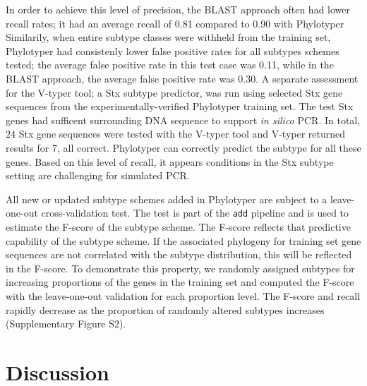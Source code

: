 \documentclass{bioinfo}
\begin{document}
In order to achieve this level of precision, the BLAST approach often had lower recall rates; it had an average recall of 0.81 compared to 0.90 with Phylotyper
Similarily, when entire subtype classes were withheld from the training set, Phylotyper had consistenly lower false positive rates for all subtypes schemes tested; the average false positive rate in this test case was 0.11, while in the BLAST approach, the average false positive rate was 0.30.
A separate assessment for the V-typer tool; a Stx subtype predictor, was run using selected Stx gene sequences from the experimentally-verified Phylotyper training set.
The test Stx genes had sufficent surrounding DNA sequence to support \textit{in silico} PCR.
In total, 24 Stx gene sequences were tested with the V-typer tool and V-typer returned results for 7, all correct.
Phylotyper can correctly predict the subtype for all these genes.
Based on this level of recall, it appears conditions in the Stx subtype setting are challenging for simulated PCR.

All new or updated subtype schemes added in Phylotyper are subject to a leave-one-out cross-validation test.
The test is part of the \texttt{add} pipeline and is used to estimate the F-score of the subtype scheme. 
The F-score reflects that predictive capability of the subtype scheme. 
If the associated phylogeny for training set gene sequences are not correlated with the subtype distribution, this will be reflected in the F-score. 
To demonstrate this property, we randomly assigned subtypes for increasing proportions of the genes in the training set and computed the F-score with the leave-one-out validation for each proportion level.
The F-score and recall rapidly decrease as the proportion of randomly altered subtypes increases (Supplementary Figure S2).

\section{Discussion}
\end{document}

